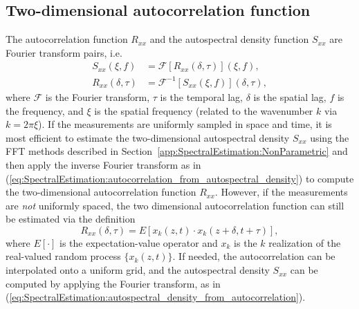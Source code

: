 \subsection{Two-dimensional autocorrelation function}
\label{app:SpectralEstimation:2d_spectra:correlation_function}
The autocorrelation function $R_{xx}$ and
the autospectral density function $S_{xx}$
are Fourier transform pairs, i.e.\
\begin{align}
  S_{xx}(\xi, f)
  &=
  \mathcal{F}[R_{xx}(\delta, \tau)](\xi, f),
  \label{eq:SpectralEstimation:autospectral_density_from_autocorrelation}
  \\
  R_{xx}(\delta, \tau)
  &=
  \mathcal{F}^{-1}[S_{xx}(\xi, f)](\delta, \tau),
  \label{eq:SpectralEstimation:autocorrelation_from_autospectral_density}
\end{align}
where
$\mathcal{F}$ is the Fourier transform,
$\tau$ is the temporal lag,
$\delta$ is the spatial lag,
$f$ is the frequency, and
$\xi$ is the spatial frequency
(related to the wavenumber $k$ via $k = 2 \pi \xi$).
If the measurements are uniformly sampled in space and time,
it is most efficient to estimate
the two-dimensional autospectral density $S_{xx}$
using the FFT methods described in
Section~\ref{app:SpectralEstimation:NonParametric} and
then apply the inverse Fourier transform
as in (\ref{eq:SpectralEstimation:autocorrelation_from_autospectral_density})
to compute the two-dimensional autocorrelation function $R_{xx}$.
However, if the measurements are \emph{not} uniformly spaced,
the two dimensional autocorrelation function
can still be estimated via the definition
\begin{equation}
  R_{xx}(\delta, \tau)
  =
  E[x_k(z, t) \cdot x_k(z + \delta, t + \tau)],
  \label{eq:SpectralEstimation:autocorrelation_definition}
\end{equation}
where $E[\cdot]$ is the expectation-value operator and
$x_k$ is the $k$ realization
of the real-valued random process $\{x_k(z, t)\}$.
If needed, the autocorrelation can be interpolated onto a uniform grid, and
the autospectral density $S_{xx}$ can be computed
by applying the Fourier transform,
as in (\ref{eq:SpectralEstimation:autospectral_density_from_autocorrelation}).


